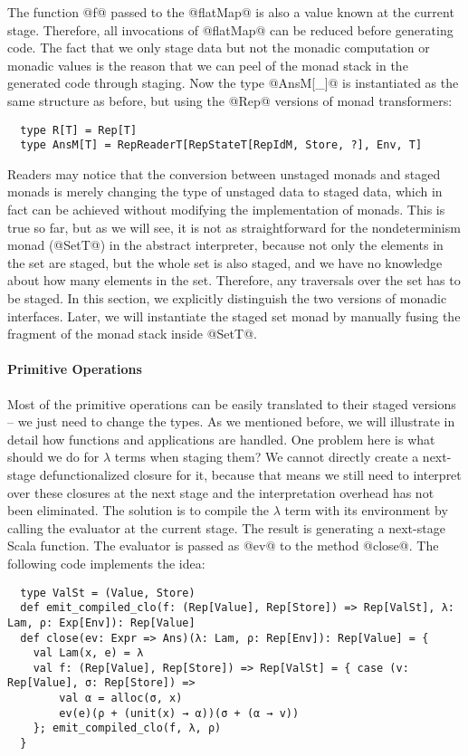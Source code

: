 The function @f@ passed to the @flatMap@ is also a value known at the current stage.
Therefore, all invocations of @flatMap@ can be reduced before generating code.
The fact that we only stage data but not the monadic computation or monadic
values is the reason that we can peel of the monad stack in the generated code
through staging.  Now the type @AnsM[_]@ is instantiated as the same structure
as before, but using the @Rep@ versions of monad transformers:
\begin{lstlisting}
  type R[T] = Rep[T]
  type AnsM[T] = RepReaderT[RepStateT[RepIdM, Store, ?], Env, T]
\end{lstlisting}

Readers may notice that the conversion between unstaged monads and staged monads
is merely changing the type of unstaged data to staged data, which in fact can
be achieved without modifying the implementation of monads. This is true so far,
but as we will see, it is not as straightforward for the nondeterminism monad
(@SetT@) in the abstract interpreter, because not only the elements in the set are
staged, but the whole set is also staged, and we have no knowledge about how
many elements in the set. Therefore, any traversals over the set has to be
staged.  In this section, we explicitly distinguish the two versions of monadic
interfaces. Later, we will instantiate the staged set monad by manually fusing
the fragment of the monad stack inside @SetT@.

\paragraph{Primitive Operations} Most of the primitive operations can be easily
translated to their staged versions -- we just need to change the types.  As we
mentioned before, we will illustrate in detail how functions and applications
are handled.  One problem here is what should we do for $\lambda$ terms when
staging them? We cannot directly create a next-stage defunctionalized closure
for it, because that means we still need to interpret over these closures at the
next stage and the interpretation overhead has not been eliminated. 
The solution is to compile the $\lambda$ term with its environment by calling
the evaluator at the current stage. The result is generating a next-stage
Scala function. The evaluator is passed as @ev@ to the method @close@.
The following code implements the idea:
\begin{lstlisting}
  type ValSt = (Value, Store)
  def emit_compiled_clo(f: (Rep[Value], Rep[Store]) => Rep[ValSt], λ: Lam, ρ: Exp[Env]): Rep[Value]
  def close(ev: Expr => Ans)(λ: Lam, ρ: Rep[Env]): Rep[Value] = {
    val Lam(x, e) = λ
    val f: (Rep[Value], Rep[Store]) => Rep[ValSt] = { case (v: Rep[Value], σ: Rep[Store]) =>
        val α = alloc(σ, x)
        ev(e)(ρ + (unit(x) → α))(σ + (α → v))
    }; emit_compiled_clo(f, λ, ρ)
  }
\end{lstlisting}

